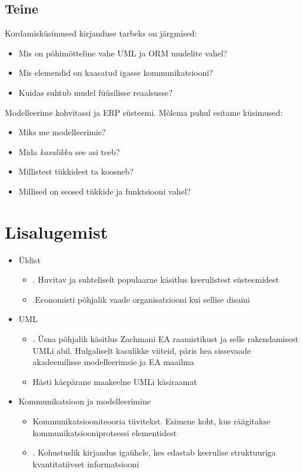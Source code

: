 \documentclass[nobib]{tufte-handout}
\begin{document}
\subsection{Teine}
Kordamisküsimused kirjanduse tarbeks on järgmised:
\begin{itemize}
	\item Mis on põhimõtteline vahe UML ja ORM mudelite vahel?
	\item Mis elemendid on kaasatud igasse kommunikatsiooni?
	\item Kuidas suhtub mudel füüsilisse reaalsusse?
\end{itemize}

Modelleerime kohvitassi ja ERP süsteemi. Mõlema puhul esitame küsimused:
\begin{itemize}
	\item Miks me modelleerimie?
	\item Mida \emph{kasulikku} see asi teeb?
	\item Millistest tükkidest ta koosneb?
	\item Millised on seosed tükkide ja funktsiooni vahel?
\end{itemize}

\section{Lisalugemist}
\begin{itemize}
	\item Üldist
	\begin{itemize}	
		\item \cite{simon1996sciences}. Huvitav ja suhteliselt populaarne käsitlus keerulistest süsteemidest 
		\item  \cite{stanford2005guide}.Economisti põhjalik vaade organisatsiooni kui sellise disaini
	\end{itemize}
	\item UML
	\begin{itemize}
		\item \cite{fatolahi2006investigation}. Üsna põhjalik käsitlus Zachmani EA raamistikust ja selle rakendamisest UMLi abil. Hulgaliselt kasulikke viiteid, päris hea sissevaade akadeemilisse modelleerimsie ja EA maailma
		\item \cite{umldistilled} Hästi käepärane maakeelne UMLi käsiraamat
	\end{itemize}
	\item Kommunikatsioon ja modelleerimine
	\begin{itemize}
		\item \cite{shannon2001mathematical} Kommunikatsiooniteooria tüvitekst. Esimene koht, kus räägitakse kommunikatsiooniprotsessi elementidest
		\item \cite{tufte}. Kohustuslik kirjandus igaühele, kes edastab keerulise struktuuriga kvantitatiivset informatsiooni
	\end{itemize}
\end{itemize}



\end{document}
